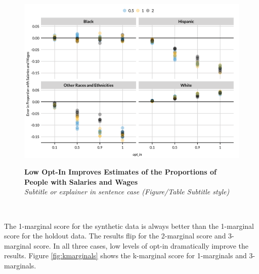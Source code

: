 \documentclass[
]{urban-formatting}
\begin{document}
\begin{figure}[htbp]
    \caption{
    \textbf{Low Opt-In Improves Estimates of the Proportions of People with Salaries and Wages}\\
    \textit{Subtitle or explainer in sentence case (Figure/Table Subtitle style)}
    }
    \centering
    \includegraphics[width=6.5in]{../analysis/figures/proportion-with-wages-3.png}
    \label{fig:prop-wages}
\end{figure}
\begin{singlespace}
    \\
\end{singlespace}

The 1-marginal score for the synthetic data is always better than the
1-marginal score for the holdout data. The results flip for the
2-marginal score and 3-marginal score. In all three cases, low levels of
opt-in dramatically improve the results. Figure \ref{fig:kmarginals}
shows the k-marginal score for 1-marginals and 3-marginals.
\end{document}
